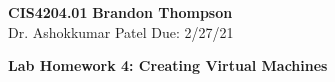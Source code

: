 \noindent
\textbf{CIS4204.01} \hfill \textbf{Brandon Thompson} \\
\normalsize Dr. Ashokkumar Patel \hfill Due: 2/27/21\\

\begin{center}
\textbf{Lab Homework 4: Creating Virtual Machines}
\end{center}